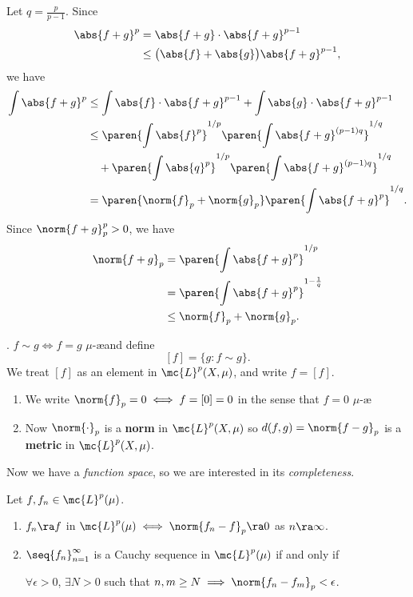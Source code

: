Let \(q = \frac{p}{p-1}\). Since
\[
    \begin{aligned}
        \abs{f + g}^p & = \abs{f + g}\cdot \abs{f + g}^{p - 1}                \\
                      & \leq \bigl(\abs{f} + \abs{g}\bigr) \abs{f + g}^{p-1},
    \end{aligned}
\]
we have
\[
    \begin{aligned}
        \int \abs{f+g}^p & \leq \int \abs{f} \cdot \abs{f+g}^{p-1} + \int \abs{g} \cdot \abs{f+g}^{p-1} \\
                         & \leq \paren{\int \abs{f}^p }^{1/p}\paren{\int \abs{f+g}^{(p-1)q}}^{1/q}      \\
                         & \quad + \paren{\int \abs{q}^p }^{1/p}\paren{\int \abs{f+g}^{(p-1)q}}^{1/q}   \\
                         & = \paren{\norm{f}_p + \norm{g}_p} \paren{\int \abs{f+g}^p}^{1/q}.
    \end{aligned}
\]
Since \(\norm{f + g}_p^p > 0\), we have
\[
    \begin{aligned}
        \norm{f + g}_p & = \paren{\int \abs{f+g}^p}^{1/p}             \\
                       & = \paren{\int \abs{f+g}^p}^{1 - \frac{1}{q}} \\
                       & \leq \norm{f}_p + \norm{g}_p.
    \end{aligned}
\]

. \(f \sim g \iff f = g\) \(\mu\)-\ae and define
\[
    [f] = \{g : f \sim g\}.
\]
We treat \([f]\) as an element in \(\mc{L}^{p}(X, \mu)\), and write \(f = [f]\).

\rmk
\begin{enumerate}
    \item We write \(\norm{f}_p = 0 \iff f = [0] = 0\) in the sense that \(f = 0\) \(\mu\)-\ae
    \item Now \(\norm{\cdot}_p\) is a \textbf{norm} in \(\mc{L}^{p}(X, \mu)\) so \(d(f, g) = \norm{f - g}_p\) is a \textbf{metric} in \(\mc{L}^{p}(X, \mu)\).
\end{enumerate}

Now we have a \textit{function space}, so we are interested in its \textit{completeness}.

  Let \(f, f_n \in \mc{L}^{p}(\mu)\).
\begin{enumerate}
    \item \(f_n \ra f\) in \(\mc{L}^p(\mu) \iff \norm{f_n-f}_p \ra 0\) as \(n \ra \infty\).
    \item \(\seq{f_n}_{n=1}^\infty\) is a Cauchy sequence in \(\mc{L}^{p}(\mu)\) if and only if
          \begin{center}
              \(\forall \epsilon > 0\), \(\exists N > 0\) such that \(n, m \geq N \implies \norm{f_n-f_m}_p < \epsilon\).
          \end{center}
\end{enumerate}

